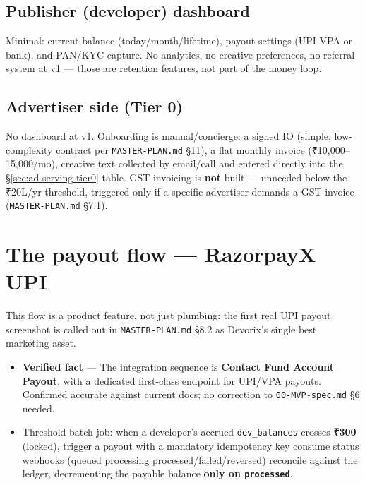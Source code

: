 \subsection{Publisher (developer) dashboard}
\label{sec:publisher-dashboard}

Minimal: current balance (today/month/lifetime), payout settings (UPI VPA or bank), and PAN/KYC capture. No analytics, no creative preferences, no referral system at v1 --- those are retention features, not part of the money loop.

\subsection{Advertiser side (Tier 0)}
\label{sec:advertiser-tier0}

No dashboard at v1. Onboarding is manual/concierge: a signed IO (simple, low-complexity contract per \texttt{MASTER-PLAN.md} \S11), a flat monthly invoice (₹10,000--15,000/mo), creative text collected by email/call and entered directly into the \S\ref{sec:ad-serving-tier0} table. GST invoicing is \textbf{not} built --- unneeded below the ₹20L/yr threshold, triggered only if a specific advertiser demands a GST invoice (\texttt{MASTER-PLAN.md} \S7.1).

\section{The payout flow --- RazorpayX UPI}
\label{sec:payout-flow}

This flow is a product feature, not just plumbing: the first real UPI payout screenshot is called out in \texttt{MASTER-PLAN.md} \S8.2 as Devorix's single best marketing asset.

\begin{itemize}
  \item \textbf{Verified fact} \citep{razorpaypayouts_2026} --- The integration sequence is \textbf{Contact \textrightarrow{} Fund Account \textrightarrow{} Payout}, with a dedicated first-class endpoint for UPI/VPA payouts. Confirmed accurate against current docs; no correction to \texttt{00-MVP-spec.md} \S6 needed.
  \item Threshold batch job: when a developer's accrued \texttt{dev\_balances} crosses \textbf{₹300} (locked), trigger a payout with a mandatory idempotency key \textrightarrow{} consume status webhooks (queued \textrightarrow{} processing \textrightarrow{} processed/failed/reversed) \textrightarrow{} reconcile against the ledger, decrementing the payable balance \textbf{only on \texttt{processed}}.
\end{itemize}

